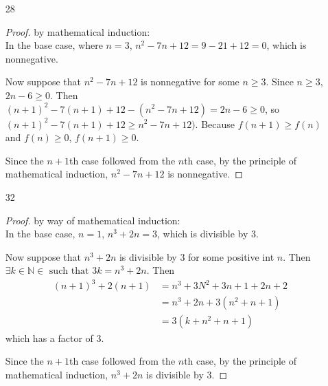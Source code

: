 \documentclass{article}
\begin{document}
\begin{enumerate}
\begin{proof}
      Now suppose that $3^n < n!$ for some $n > 6$. Then $3^{n+1} = 3 \cdot 3^n$
      and $(n+1)! = (n+1)n!$. $3^n < n!$, so $3\cdot 3^n < (n+1)n!$ when $n+1>3$
      which is given.

      Since the $n+1$th case followed from the $n$th case, by the principle
      of mathematical induction, $3^n < n!$ for $n > 6$.
    \end{proof}
  \item[28]
    \begin{proof} by mathematical induction:\\
      In the base case, where $n=3$, $n^2-7n+12 = 9-21+12 = 0$, which is
      nonnegative.

      Now suppose that $n^2-7n+12$ is nonnegative for some $n \geq 3$.
      Since $n \geq 3$, $2n - 6 \geq 0$. Then $(n+1)^2 - 7(n+1) + 12 -
      (n^2-7n+12) = 2n - 6 \geq 0$, so $(n+1)^2 - 7(n+1) + 12 \geq
      n^2 -7n + 12)$. Because $f(n+1) \geq f(n)$ and $f(n) \geq 0$,
      $f(n+1) \geq 0$.

      Since the $n+1$th case followed from the $n$th case, by the principle
      of mathematical induction, $n^2 - 7n + 12$ is nonnegative.
    \end{proof}
  \item[32]
    \begin{proof} by way of mathematical induction:\\
      In the base case, $n=1$, $n^3 + 2n = 3$, which is divisible by 3.

      Now suppose that $n^3 + 2n$ is divisible by 3 for some positive int $n$.
      Then $\exists k \in \mathbb{N} \in \text{ such that } 3k = n^3 + 2n$.
      Then
      \begin{align*}
        (n+1)^3 + 2(n+1)
        &= n^3 + 3N^2 + 3n + 1 +2n + 2\\
        &= n^3 + 2n + 3(n^2 + n + 1)\\
        &= 3(k + n^2 + n + 1)
      \end{align*}
      which has a factor of 3.

      Since the $n+1$th case followed from the $n$th case, by the principle
      of mathematical induction, $n^3 + 2n$ is divisible by 3. 
    \end{proof}
\end{enumerate}
\end{document}

